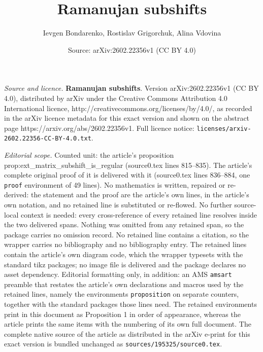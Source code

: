 \documentclass[10pt,a4paper]{amsart}
\title{\textbf{Ramanujan subshifts}}
\author{Ievgen Bondarenko, Rostislav Grigorchuk, Alina Vdovina}
\date{Source: arXiv:2602.22356v1 (CC BY 4.0)}
\begin{document}
\maketitle

\noindent\emph{Source and licence.} \textbf{Ramanujan subshifts}. Version arXiv:2602.22356v1 (CC BY 4.0), distributed by arXiv under the Creative Commons Attribution 4.0 International licence, http://creativecommons.org/licenses/by/4.0/, as recorded in the arXiv licence metadata for this exact version and shown on the abstract page https://arxiv.org/abs/2602.22356v1. Full licence notice: \texttt{licenses/arxiv-2602.22356-CC-BY-4.0.txt}.\par\smallskip

\noindent\textit{Editorial scope.} Counted unit: the article's proposition prop:ext\_matrix\_subshift\_is\_regular (source0.tex lines 815--835). The article's complete original proof of it is delivered with it (source0.tex lines 836--884, one \texttt{proof} environment of 49 lines). No mathematics is written, repaired or re-derived: the statement and the proof are the article's own lines, in the article's own notation, and no retained line is substituted or re-flowed.  No further source-local context is needed: every cross-reference of every retained line resolves inside the two delivered spans.  Nothing was omitted from any retained span, so the package carries no omission record.  No retained line contains a citation, so the wrapper carries no bibliography and no bibliography entry.  The retained lines contain the article's own diagram code, which the wrapper typesets with the standard tikz packages; no image file is delivered and the package declares no asset dependency.  Editorial formatting only, in addition: an AMS \texttt{amsart} preamble that restates the article's own declarations and macros used by the retained lines, namely the environments \texttt{proposition} on separate counters, together with the standard packages those lines need.  The retained environments print in this document as Proposition 1 in order of appearance, whereas the article prints the same items with the numbering of its own full document.  The complete native source of the article as distributed in the arXiv e-print for this exact version is bundled unchanged as \texttt{sources/195325/source0.tex}.
\end{document}
